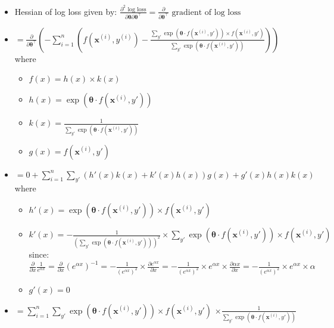 \begin{itemize}
    \item Hessian of log loss given by:
    $
    \frac{\partial^2 \textrm{ log loss}}{\partial \boldsymbol{\theta} \partial \boldsymbol{\theta}^\intercal} = \frac{\partial}{\partial \boldsymbol{\theta}^\intercal} \textrm{ gradient of log loss}
    $
    \item $
    = \frac{\partial}{\partial \boldsymbol{\theta}^\intercal} ( - \sum_{i=1}^n ( f(\boldsymbol{x}^{(i)}, y^{(i)}) - \frac{\sum_{y'} \exp(\boldsymbol{\theta} \cdot f(\boldsymbol{x}^{(i)}, y')) \times f(\boldsymbol{x}^{(i)}, y')}{\sum_{y'} \exp(\boldsymbol{\theta} \cdot f(\boldsymbol{x}^{(i)}, y'))} ) )
    $ where
    \begin{itemize}
        \item $f(x) = h(x) \times k(x)$
        \item $h(x) = \exp(\boldsymbol{\theta} \cdot f(\boldsymbol{x}^{(i)}, y'))$
        \item $k(x) = \frac{1}{\sum_{y'} \exp(\boldsymbol{\theta} \cdot f(\boldsymbol{x}^{(i)}, y'))}$
        \item $g(x) = f(\boldsymbol{x}^{(i)}, y')$
    \end{itemize}
    \item $ = 0 + \sum_{i=1}^n \sum_{y'} ( h'(x)k(x) + k'(x)h(x) ) g(x) + g'(x)h(x)k(x)$ where
    \begin{itemize}
        \item $h'(x) = \exp(\boldsymbol{\theta} \cdot f(\boldsymbol{x}^{(i)}, y')) \times f(\boldsymbol{x}^{(i)}, y')$
        \item $k'(x) = -\frac{1}{(\sum_{y'} \exp(\boldsymbol{\theta} \cdot f(\boldsymbol{x}^{(i)}, y')))^2} \times \sum_{y'} \exp(\boldsymbol{\theta} \cdot f(\boldsymbol{x}^{(i)}, y')) \times f(\boldsymbol{x}^{(i)}, y')$\\
        since: $\frac{\partial}{\partial x} \frac{1}{e^{\alpha x}} = \frac{\partial}{\partial x} (e^{\alpha x})^{-1} = -\frac{1}{(e^{\alpha x})^2} \times \frac{\partial e^{\alpha x}}{\partial x} = -\frac{1}{(e^{\alpha x})^2} \times e^{\alpha x} \times \frac{\partial \alpha x}{\partial x} = -\frac{1}{(e^{\alpha x})^2} \times e^{\alpha x} \times \alpha$
        \item $g'(x) = 0$
    \end{itemize}
    \item $ = \sum_{i=1}^n \sum_{y'} \exp(\boldsymbol{\theta} \cdot f(\boldsymbol{x}^{(i)}, y')) \times f(\boldsymbol{x}^{(i)}, y')$ 
    $\times \frac{1}{\sum_{y'} \exp(\boldsymbol{\theta} \cdot f(\boldsymbol{x}^{(i)}, y'))}$

\end{itemize}
